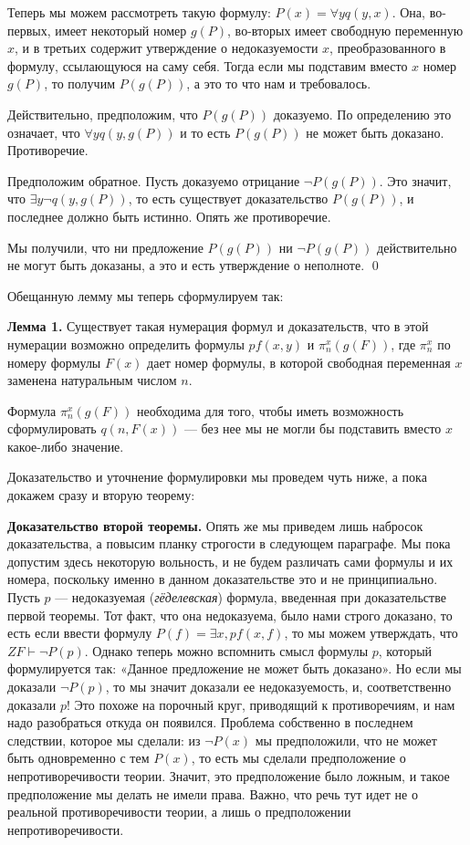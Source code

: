 Теперь мы можем рассмотреть такую формулу: $P(x) = \forall y q(y, x)$. Она, во-первых, имеет некоторый номер $g(P)$, во-вторых имеет свободную переменную $x$, и в третьих содержит утверждение о недоказуемости $x$, преобразованного в формулу, ссылающуюся на саму себя. Тогда если мы подставим вместо $x$ номер $g(P)$, то получим $P(g(P))$, а это то что нам и требовалось.

Действительно, предположим, что $P(g(P))$ доказуемо. По определению это означает, что $\forall y q(y, g(P))$ и то есть $P(g(P))$ не может быть доказано. Противоречие.

Предположим обратное. Пусть доказуемо отрицание $\neg P(g(P))$. Это значит, что $\exists y \neg q(y, g(P))$, то есть существует доказательство $P(g(P))$, и последнее должно быть истинно. Опять же противоречие.

Мы получили, что ни предложение $P(g(P))$ ни $\neg P(g(P))$ действительно не могут быть доказаны, а это и есть утверждение о неполноте. \qed

Обещанную лемму мы теперь сформулируем так:

{\bfseries Лемма 1.} Существует такая нумерация формул и доказательств, что в этой нумерации возможно определить формулы $pf(x, y)$ и $\pi^x_n(g(F))$, где $\pi^x_n$ по номеру формулы $F(x)$ дает номер формулы, в которой свободная переменная $x$ заменена натуральным числом $n$.

Формула $\pi^x_n(g(F))$ необходима для того, чтобы иметь возможность сформулировать $q(n, F(x))$ — без нее мы не могли бы подставить вместо $x$ какое-либо значение.

Доказательство и уточнение формулировки мы проведем чуть ниже, а пока докажем сразу и вторую теорему:

{\bfseries Доказательство второй теоремы.} Опять же мы приведем лишь набросок доказательства, а повысим планку строгости в следующем параграфе. Мы пока допустим здесь некоторую вольность, и не будем различать сами формулы и их номера, поскольку именно в данном доказательстве это и не принципиально. Пусть $p$ — недоказуемая ({\slshape гёделевская}) формула, введенная при доказательстве первой теоремы. Тот факт, что она недоказуема, было нами строго доказано, то есть если ввести формулу $P(f) = \exists x, pf(x, f)$, то мы можем утверждать, что $ZF\vdash \neg P(p)$. Однако теперь можно вспомнить смысл формулы $p$, который формулируется так: «Данное предложение не может быть доказано». Но если мы доказали $\neg P(p)$, то мы значит доказали ее недоказуемость, и, соответственно доказали $p$! Это похоже на порочный круг, приводящий к противоречиям, и нам надо разобраться откуда он появился. Проблема собственно в последнем следствии, которое мы сделали: из $\neg P(x)$ мы предположили, что не может быть одновременно с тем $P(x)$, то есть мы сделали предположение о непротиворечивости теории. Значит, это предположение было ложным, и такое предположение мы делать не имели права. Важно, что речь тут идет не о реальной противоречивости теории, а лишь о предположении непротиворечивости.

